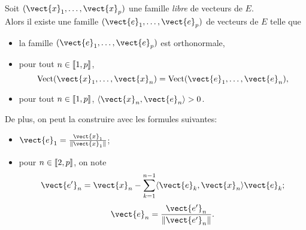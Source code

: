 \documentclass{book}
\begin{document}
\begin{Theoreme}
Soit $(\vect{x}_1,\dots,\vect{x}_p)$ une famille \emph{libre} de vecteurs de $E$.\\
Alors il existe une  famille $(\vect{e}_1,\dots,\vect{e}_p)$  de vecteurs de $E$
telle que
\begin{itemize}
\item la famille $(\vect{e}_1,\dots,\vect{e}_p)$ est orthonormale,
\item pour tout $n\in \mathopen\lbrack\!\lbrack1,p \mathclose\rbrack\!\rbrack$, \[ \Vectt (\vect{x}_1,\dots,\vect{x}_n) = \Vectt (\vect{e}_1,\dots,\vect{e}_n), \]
\item pour tout $n\in \mathopen\lbrack\!\lbrack1,p \mathclose\rbrack\!\rbrack$, $\PS{\vect{x}_n}{\vect{e}_n} > 0$.
\end{itemize}
De plus, on peut la construire avec les formules suivantes:
\begin{itemize}
\item $\vect{e}_1 = \frac{\vect{x}_1}{\norme{\vect{x}_1}}$;
\item pour $n\in \mathopen\lbrack\!\lbrack2,p \mathclose\rbrack\!\rbrack$, on note
  \[ \vect{e'}_n = \vect{x}_n - \sum_{k=1}^{n-1} \PS{\vect{e}_k}{\vect{x}_n} \vect{e}_k; \]
	\[\vect{e}_n = \frac{\vect{e'}_n}{\norme{\vect{e'}_n}}.\]
\end{itemize}
\end{Theoreme}
\end{document}
